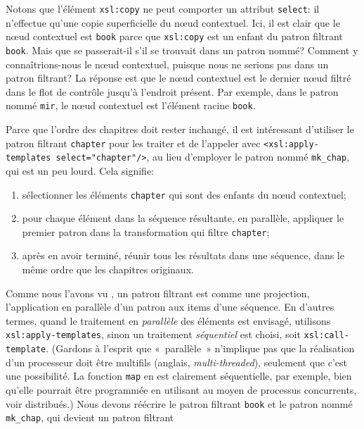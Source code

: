 Notons que l'élément \texttt{xsl:copy} ne peut comporter un attribut
\texttt{select}: il n'effectue qu'une copie superficielle du n{\oe}ud
contextuel. Ici, il est clair que le n{\oe}ud contextuel est
\texttt{book} parce que \texttt{xsl:copy} est un enfant du patron
filtrant \texttt{book}. Mais que se passerait-il s'il se trouvait dans
un patron nommé? Comment y connaîtrions-nous le n{\oe}ud contextuel,
puisque nous ne serions pas dans un patron filtrant? La réponse est
que le n{\oe}ud contextuel est le dernier n{\oe}ud filtré dans le flot
de contrôle jusqu'à l'endroit présent. Par exemple, dans le patron
nommé \texttt{mir}, le n{\oe}ud contextuel est l'élément racine
\texttt{book}.

Parce que l'ordre des chapitres doit rester inchangé, il est
intéressant d'utiliser le patron filtrant \texttt{chapter} pour les
traiter et de l'appeler avec \texttt{<xsl:apply-templates
  select="chapter"/>}, au lieu d'employer le patron nommé
\texttt{mk\_chap}, qui est un peu lourd. Cela signifie:
\begin{enumerate}

\item sélectionner les éléments \texttt{chapter} qui sont des enfants
  du n{\oe}ud contextuel;

\item pour chaque élément dans la séquence résultante, en parallèle,
  appliquer le premier patron dans la transformation qui filtre
  \texttt{chapter};

\item après en avoir terminé, réunir tous les résultats dans une
  séquence, dans le même ordre que les chapitres originaux.

\end{enumerate}
Comme nous l'avons vu , un patron filtrant est
comme une projection, l'application en parallèle d'un patron aux items
d'une séquence. En d'autres termes, quand le traitement en
\emph{parallèle} des éléments est envisagé, utilisons
\texttt{xsl:apply-templates}, sinon un traitement \emph{séquentiel}
est choisi, soit \texttt{xsl:call-template}. (Gardons à l'esprit que
«~parallèle~» n'implique pas que la réalisation d'un processeur \XSLT
doit être multifils (anglais, \emph{multi-threaded}), seulement que
c'est une possibilité. La fonction \texttt{map} en \Erlang est
clairement séquentielle, par exemple, bien qu'elle pourrait être
programmée en utilisant au moyen de processus concurrents, voir
distribués.) Nous devons réécrire le patron filtrant \texttt{book} et
le patron nommé \texttt{mk\_chap}, qui devient un patron filtrant
